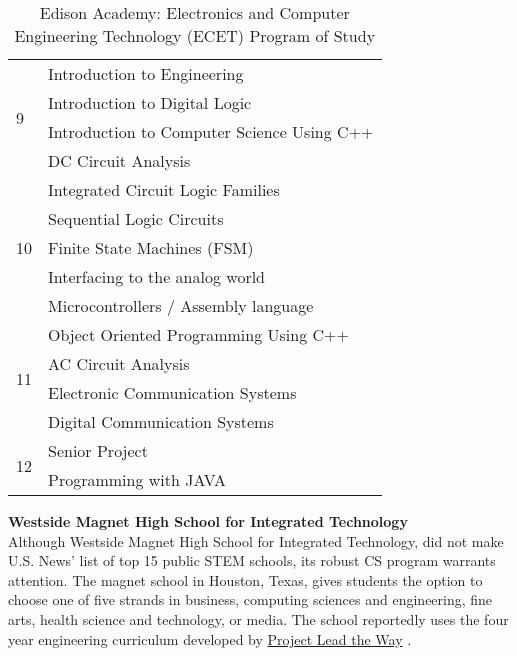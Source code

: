  \begin{table}[]
 \centering
 \caption{Edison Academy: Electronics and Computer Engineering Technology (ECET) Program of Study \cite{edisonacad}}
 \label{ecet}
 \begin{tabular}{|l|l|}
 \hline
 \multirow{4}{*}{9}  & Introduction to Engineering  \\ \cline{2-2} 
                     & Introduction to Digital Logic \\ \cline{2-2} 
                     & Introduction to Computer Science Using C++  \\ \cline{2-2} 
                     & DC Circuit Analysis \\ \hline
 \multirow{5}{*}{10} & Integrated Circuit Logic Families  \\ \cline{2-2} 
                     & Sequential Logic Circuits \\ \cline{2-2} 
                     & Finite State Machines (FSM) \\ \cline{2-2} 
                     & Interfacing to the analog world \\ \cline{2-2} 
                     & Microcontrollers / Assembly language \\ \hline
 \multirow{4}{*}{11} & Object Oriented Programming Using C++  \\ \cline{2-2} 
                     & AC Circuit Analysis \\ \cline{2-2} 
                     & Electronic Communication Systems \\ \cline{2-2} 
                     & Digital Communication Systems \\ \hline
 \multirow{2}{*}{12} & Senior Project \\ \cline{2-2} 
                     & Programming with JAVA \\ \hline
 \end{tabular}
 \end{table}
\textbf{Westside Magnet High School for Integrated Technology} \\
Although Westside Magnet High School for Integrated Technology, did not make U.S. News' list of top 15 public STEM schools, its robust CS program warrants attention. The magnet school in Houston, Texas, gives students the option to choose one of five strands in business, computing sciences and engineering, fine arts, health science and technology, or media. The school reportedly uses the four year engineering curriculum developed by \href{https://www.pltw.org/}{Project Lead the Way} \cite{westside}. \par
